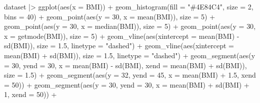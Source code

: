\documentclass[
  letterpaper,
  DIV=11,
  numbers=noendperiod]{scrreprt}
\newenvironment{Shaded}{\begin{snugshade}}{\end{snugshade}}
\newcommand{\AttributeTok}[1]{\textcolor[rgb]{0.40,0.45,0.13}{#1}}
\newcommand{\DecValTok}[1]{\textcolor[rgb]{0.68,0.00,0.00}{#1}}
\newcommand{\FloatTok}[1]{\textcolor[rgb]{0.68,0.00,0.00}{#1}}
\newcommand{\FunctionTok}[1]{\textcolor[rgb]{0.28,0.35,0.67}{#1}}
\newcommand{\NormalTok}[1]{\textcolor[rgb]{0.00,0.23,0.31}{#1}}
\newcommand{\SpecialCharTok}[1]{\textcolor[rgb]{0.37,0.37,0.37}{#1}}
\newcommand{\StringTok}[1]{\textcolor[rgb]{0.13,0.47,0.30}{#1}}
\begin{document}
\begin{Shaded}
\begin{Highlighting}[]
\NormalTok{dataset }\SpecialCharTok{|\textgreater{}} 
  \FunctionTok{ggplot}\NormalTok{(}\FunctionTok{aes}\NormalTok{(}\AttributeTok{x =}\NormalTok{ BMI)) }\SpecialCharTok{+}
  \FunctionTok{geom\_histogram}\NormalTok{(}\AttributeTok{fill =} \StringTok{"\#4E84C4"}\NormalTok{, }\AttributeTok{size =} \DecValTok{2}\NormalTok{, }\AttributeTok{bins =} \DecValTok{40}\NormalTok{) }\SpecialCharTok{+}
  \FunctionTok{geom\_point}\NormalTok{(}\FunctionTok{aes}\NormalTok{(}\AttributeTok{y =} \DecValTok{30}\NormalTok{, }\AttributeTok{x =} \FunctionTok{mean}\NormalTok{(BMI)), }\AttributeTok{size =} \DecValTok{5}\NormalTok{) }\SpecialCharTok{+}
  \FunctionTok{geom\_point}\NormalTok{(}\FunctionTok{aes}\NormalTok{(}\AttributeTok{y =} \DecValTok{30}\NormalTok{, }\AttributeTok{x =} \FunctionTok{median}\NormalTok{(BMI)), }\AttributeTok{size =} \DecValTok{5}\NormalTok{) }\SpecialCharTok{+}
  \FunctionTok{geom\_point}\NormalTok{(}\FunctionTok{aes}\NormalTok{(}\AttributeTok{y =} \DecValTok{30}\NormalTok{, }\AttributeTok{x =} \FunctionTok{getmode}\NormalTok{(BMI)), }\AttributeTok{size =} \DecValTok{5}\NormalTok{) }\SpecialCharTok{+}
  \FunctionTok{geom\_vline}\NormalTok{(}\FunctionTok{aes}\NormalTok{(}\AttributeTok{xintercept =} \FunctionTok{mean}\NormalTok{(BMI) }\SpecialCharTok{{-}} \FunctionTok{sd}\NormalTok{(BMI)), }\AttributeTok{size =} \FloatTok{1.5}\NormalTok{, }\AttributeTok{linetype =} \StringTok{"dashed"}\NormalTok{) }\SpecialCharTok{+} 
  \FunctionTok{geom\_vline}\NormalTok{(}\FunctionTok{aes}\NormalTok{(}\AttributeTok{xintercept =} \FunctionTok{mean}\NormalTok{(BMI) }\SpecialCharTok{+} \FunctionTok{sd}\NormalTok{(BMI)), }\AttributeTok{size =} \FloatTok{1.5}\NormalTok{, }\AttributeTok{linetype =} \StringTok{"dashed"}\NormalTok{) }\SpecialCharTok{+}
  \FunctionTok{geom\_segment}\NormalTok{(}\FunctionTok{aes}\NormalTok{(}\AttributeTok{y =} \DecValTok{30}\NormalTok{, }\AttributeTok{yend =} \DecValTok{30}\NormalTok{, }\AttributeTok{x =} \FunctionTok{mean}\NormalTok{(BMI) }\SpecialCharTok{{-}} \FunctionTok{sd}\NormalTok{(BMI), }\AttributeTok{xend =} \FunctionTok{mean}\NormalTok{(BMI) }\SpecialCharTok{+} \FunctionTok{sd}\NormalTok{(BMI)), }\AttributeTok{size =} \FloatTok{1.5}\NormalTok{) }\SpecialCharTok{+}
  \FunctionTok{geom\_segment}\NormalTok{(}\FunctionTok{aes}\NormalTok{(}\AttributeTok{y =} \DecValTok{32}\NormalTok{, }\AttributeTok{yend =} \DecValTok{45}\NormalTok{, }\AttributeTok{x =} \FunctionTok{mean}\NormalTok{(BMI) }\SpecialCharTok{+} \FloatTok{1.5}\NormalTok{, }\AttributeTok{xend =} \DecValTok{50}\NormalTok{)) }\SpecialCharTok{+}
  \FunctionTok{geom\_segment}\NormalTok{(}\FunctionTok{aes}\NormalTok{(}\AttributeTok{y =} \DecValTok{30}\NormalTok{, }\AttributeTok{yend =} \DecValTok{30}\NormalTok{, }\AttributeTok{x =} \FunctionTok{mean}\NormalTok{(BMI) }\SpecialCharTok{+} \FunctionTok{sd}\NormalTok{(BMI) }\SpecialCharTok{+} \DecValTok{1}\NormalTok{, }\AttributeTok{xend =} \DecValTok{50}\NormalTok{)) }\SpecialCharTok{+}

\end{Highlighting}
\end{Shaded}
\end{document}
